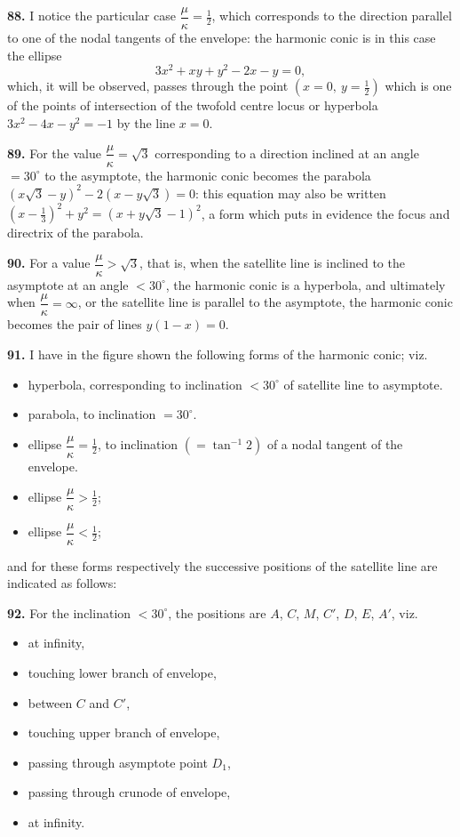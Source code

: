 \documentclass[11pt,a4paper]{article}
\theoremstyle{plain}
\begin{document}
\noindent\textbf{88.} I notice the particular case $\dfrac{\mu}{\kappa} = \tfrac{1}{2}$, which corresponds to the direction parallel to one of the nodal tangents of the envelope: the harmonic conic is in this case the ellipse
\[
3x^2 + xy + y^2 - 2x - y = 0,
\]
which, it will be observed, passes through the point $(x=0,\ y=\tfrac{1}{2})$ which is one of the points of intersection of the twofold centre locus or hyperbola $3x^2 - 4x - y^2 = -1$ by the line $x = 0$.

\noindent\textbf{89.} For the value $\dfrac{\mu}{\kappa} = \sqrt{3}$ corresponding to a direction inclined at an angle $= 30^{\circ}$ to the asymptote, the harmonic conic becomes the parabola $(x\sqrt{3} - y)^2 - 2(x - y\sqrt{3}) = 0$: this equation may also be written $(x - \tfrac{1}{3})^2 + y^2 = (x + y\sqrt{3} - 1)^2$, a form which puts in evidence the focus and directrix of the parabola.

\noindent\textbf{90.} For a value $\dfrac{\mu}{\kappa} > \sqrt{3}$, that is, when the satellite line is inclined to the asymptote at an angle $< 30^{\circ}$, the harmonic conic is a hyperbola, and ultimately when $\dfrac{\mu}{\kappa} = \infty$, or the satellite line is parallel to the asymptote, the harmonic conic becomes the pair of lines $y(1-x) = 0$.

\noindent\textbf{91.} I have in the figure shown the following forms of the harmonic conic; viz.
\begin{itemize}[nosep]
\item hyperbola, corresponding to inclination $< 30^{\circ}$ of satellite line to asymptote.
\item parabola, to inclination $= 30^{\circ}$.
\item ellipse $\dfrac{\mu}{\kappa} = \tfrac{1}{2}$, to inclination $(= \tan^{-1}2)$ of a nodal tangent of the envelope.
\item ellipse $\dfrac{\mu}{\kappa} > \tfrac{1}{2}$;
\item ellipse $\dfrac{\mu}{\kappa} < \tfrac{1}{2}$;
\end{itemize}
and for these forms respectively the successive positions of the satellite line are indicated as follows:

\noindent\textbf{92.} For the inclination $< 30^{\circ}$, the positions are $A$, $C$, $M$, $C'$, $D$, $E$, $A'$, viz.
\begin{itemize}[nosep]
\item[$A$,] at infinity,
\item[$C$,] touching lower branch of envelope,
\item[$M$,] between $C$ and $C'$,
\item[$C'$,] touching upper branch of envelope,
\item[$D$,] passing through asymptote point $D_1$,
\item[$E$,] passing through crunode of envelope,
\item[$A'$,] at infinity.
\end{itemize}
\end{document}
